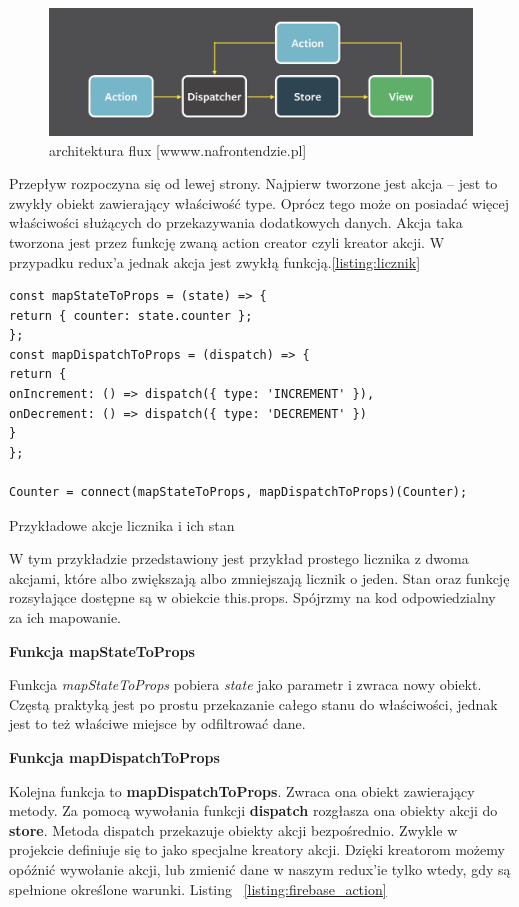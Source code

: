 \begin{figure}
	\centering\includegraphics[width=.6\textwidth]{img/flux}
	\caption{architektura flux [wwww.nafrontendzie.pl]}\label{rys:flux}%
\end{figure}

Przepływ rozpoczyna się od lewej strony. Najpierw tworzone jest akcja – jest to zwykły obiekt zawierający właściwość type.
Oprócz tego może on posiadać więcej właściwości służących do przekazywania dodatkowych danych.
Akcja taka tworzona jest przez funkcję zwaną action creator czyli kreator akcji.
W przypadku redux'a jednak akcja jest zwykłą funkcją.\ref{listing:licznik}

\begin{listing}
\begin{verbatim}
const mapStateToProps = (state) => {
return { counter: state.counter };
};
const mapDispatchToProps = (dispatch) => {
return {
onIncrement: () => dispatch({ type: 'INCREMENT' }),
onDecrement: () => dispatch({ type: 'DECREMENT' })
}
};

Counter = connect(mapStateToProps, mapDispatchToProps)(Counter);
\end{verbatim}
\caption{Przykładowe akcje licznika i ich stan} \label{listing:licznik}
\end{listing}

W tym przykładzie przedstawiony jest przykład prostego licznika z dwoma akcjami,
które albo zwiększają albo zmniejszają licznik o jeden.
Stan oraz funkcję rozsyłające dostępne są w obiekcie this.props. Spójrzmy na kod odpowiedzialny za ich mapowanie.
\begin{center}
	\textbf{Funkcja mapStateToProps}
\end{center}
Funkcja \textit{mapStateToProps} pobiera \textit{state} jako parametr i zwraca nowy obiekt.
Częstą praktyką jest po prostu przekazanie całego stanu do właściwości, jednak jest to też właściwe miejsce by odfiltrować dane. 
\begin{center}
	\textbf{Funkcja mapDispatchToProps}
\end{center}
Kolejna funkcja to \textbf{mapDispatchToProps}. Zwraca ona obiekt zawierający metody.
Za pomocą wywołania funkcji \textbf{dispatch} rozgłasza ona obiekty akcji do \textbf{store}.
Metoda dispatch przekazuje obiekty akcji bezpośrednio.
Zwykle w projekcie definiuje się to jako specjalne kreatory akcji. Dzięki kreatorom możemy opóźnić wywołanie akcji,
lub zmienić dane w naszym redux'ie tylko wtedy, gdy są spełnione określone warunki. Listing 
~\ref{listing:firebase_action}

